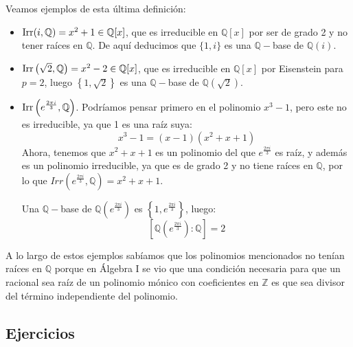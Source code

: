\begin{ejemplo}
    Veamos ejemplos de esta última definición:
    \begin{itemize}
        \item $\operatorname{Irr}(i,\mathbb{Q}) = x^2+1 \in \mathbb{Q}[x]$, que es irreducible en $\mathbb{Q}[x]$  por ser de grado 2 y no tener raíces en $\mathbb{Q}$. De aquí deducimos que $\{1,i\}$ es una $\mathbb{Q}-$base de $\mathbb{Q}(i)$.
        \item $\operatorname{Irr}\left(\sqrt{2}, \mathbb{Q}\right) = x^2-2 \in \mathbb{Q}[x]$, que es irreducible en $\mathbb{Q}[x]$ por Eisenstein para $p=2$, luego $\left\{1,\sqrt{2}\right\}$ es una $\mathbb{Q}-$base de $\mathbb{Q}(\sqrt{2})$.
        \item $\operatorname{Irr}\left(e^{\frac{2\pi i}{3}}, \mathbb{Q}\right)$. Podríamos pensar primero en el polinomio $x^3-1$, pero este no es irreducible, ya que 1 es una raíz suya:
            \begin{equation*}
                x^3-1 = (x-1)\left(x^2+x+1\right)
            \end{equation*}
            Ahora, tenemos que $x^2+x+1$ es un polinomio del que $e^{\frac{2\pi i}{3}}$ es raíz, y además es un polinomio irreducible, ya que es de grado 2 y no tiene raíces en $\mathbb{Q}$, por lo que $Irr\left(e^{\frac{2\pi i}{3}}, \mathbb{Q}\right) = x^2+x+1$.

            Una $\mathbb{Q}-$base de $\mathbb{Q}\left(e^{\frac{2\pi i}{3}}\right)$ es $\left\{1,e^{\frac{2\pi i}{3}}\right\}$, luego:
            \begin{equation*}
                \left[\mathbb{Q}\left(e^{\frac{2\pi i}{3}}\right):\mathbb{Q}\right] = 2
            \end{equation*}
    \end{itemize}
    A lo largo de estos ejemplos sabíamos que los polinomios mencionados no tenían raíces en $\mathbb{Q}$ porque en Álgebra I se vio que una condición necesaria para que un racional sea raíz de un polinomio mónico con coeficientes en $\mathbb{Z}$ es que sea divisor del término independiente del polinomio.
\end{ejemplo}

\subsection{Ejercicios}

